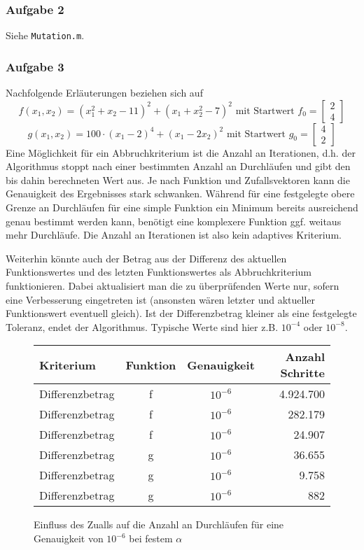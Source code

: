 \documentclass[a4paper, 12pt]{report}
\begin{document}
\subsubsection{Aufgabe 2}
Siehe \lstinline[basicstyle=\ttfamily\color{black}]|Mutation.m|.

\subsubsection{Aufgabe 3}
Nachfolgende Erläuterungen beziehen sich auf 
$$f(x_1, x_2) = (x_1^2 + x_2 - 11)^2 + (x_1 + x_2^2 - 7)^2 \text{ mit Startwert } f_0=\begin{bmatrix}2\\4\end{bmatrix}$$
$$g(x_1, x_2) = 100\cdot (x_1 - 2)^4 + (x_1 - 2x_2)^2 \text{ mit Startwert } g_0=\begin{bmatrix}4\\2\end{bmatrix}$$
Eine Möglichkeit für ein Abbruchkriterium ist die Anzahl an Iterationen, d.h. der Algorithmus stoppt nach einer bestimmten Anzahl an Durchläufen
und gibt den bis dahin berechneten Wert aus. Je nach Funktion und Zufallsvektoren kann die Genauigkeit des Ergebnisses stark schwanken. Während für
eine festgelegte obere Grenze an Durchläufen für eine simple Funktion ein Minimum bereits ausreichend genau bestimmt werden kann, benötigt eine
komplexere Funktion ggf. weitaus mehr Durchläufe. Die Anzahl an Iterationen ist also kein adaptives Kriterium.\par
Weiterhin könnte auch der Betrag aus der Differenz des aktuellen Funktionswertes und des letzten Funktionswertes als Abbruchkriterium funktionieren.
Dabei aktualisiert man die zu überprüfenden Werte nur, sofern eine Verbesserung eingetreten ist (ansonsten wären letzter und aktueller Funktionswert
eventuell gleich). Ist der Differenzbetrag kleiner als eine festgelegte Toleranz, endet der Algorithmus. Typische Werte sind hier z.B. $10^{-4}$ oder
$10^{-8}$.\\\par

\begin{figure}[H]
  \centering
  \def\arraystretch{1.25}
  \begin{tabular}{l|c|c|r}
    \hline
    \textbf{Kriterium} & \textbf{Funktion} & \textbf{Genauigkeit} & \textbf{Anzahl Schritte}\\
    \hline
    Differenzbetrag & f & $10^{-6}$ & 4.924.700\\
    Differenzbetrag & f & $10^{-6}$ & 282.179\\
    Differenzbetrag & f & $10^{-6}$ & 24.907\\
    Differenzbetrag & g & $10^{-6}$ & 36.655\\
    Differenzbetrag & g & $10^{-6}$ & 9.758\\
    Differenzbetrag & g & $10^{-6}$ & 882\\
    \hline
  \end{tabular}
  \caption{Einfluss des Zualls auf die Anzahl an Durchläufen für eine Genauigkeit von $10^{-6}$ bei festem $\alpha$}
\end{figure}
\end{document}

